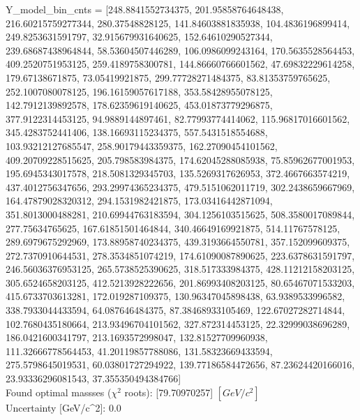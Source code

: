 \documentclass[12pt]{article}
\begin{document}
	Y\_model\_bin\_cnts = [248.8841552734375, 201.95858764648438, 216.60215759277344, 280.37548828125, 141.84603881835938, 104.4836196899414, 249.8253631591797, 32.915679931640625, 152.64610290527344, 239.68687438964844, 58.53604507446289, 106.0986099243164, 170.5635528564453, 409.2520751953125, 259.4189758300781, 144.86660766601562, 47.69832229614258, 179.67138671875, 73.05419921875, 299.77728271484375, 83.81353759765625, 252.1007080078125, 196.16159057617188, 353.58428955078125, 142.7912139892578, 178.62359619140625, 453.01873779296875, 377.9122314453125, 94.9889144897461, 82.77993774414062, 115.96817016601562, 345.4283752441406, 138.16693115234375, 557.5431518554688, 103.93212127685547, 258.90179443359375, 162.27090454101562, 409.20709228515625, 205.798583984375, 174.62045288085938, 75.85962677001953, 195.6945343017578, 218.5081329345703, 135.5269317626953, 372.4667663574219, 437.4012756347656, 293.29974365234375, 479.5151062011719, 302.2438659667969, 164.47879028320312, 294.1531982421875, 173.03416442871094, 351.8013000488281, 210.69944763183594, 304.1256103515625, 508.3580017089844, 277.75634765625, 167.61851501464844, 340.46649169921875, 514.11767578125, 289.6979675292969, 173.88958740234375, 439.3193664550781, 357.152099609375, 272.7370910644531, 278.3534851074219, 174.61090087890625, 223.6378631591797, 246.56036376953125, 265.5738525390625, 318.517333984375, 428.11212158203125, 305.6524658203125, 412.5213928222656, 201.86993408203125, 80.65467071533203, 415.6733703613281, 172.019287109375, 130.96347045898438, 63.9389533996582, 338.7933044433594, 64.087646484375, 87.38468933105469, 122.67027282714844, 102.7680435180664, 213.93496704101562, 327.872314453125, 22.32999038696289, 186.0421600341797, 213.1693572998047, 132.81527709960938, 111.32666778564453, 41.20119857788086, 131.58323669433594, 275.5798645019531, 60.03801727294922, 139.77186584472656, 87.23624420166016, 23.93336296081543, 37.355350494384766]\\

    Found optimal massses ($\chi^2$ roots): [79.70970257] $[GeV/c^{2}]$\\
    Uncertainty [GeV/c^2]: 0.0\\
\end{document}
